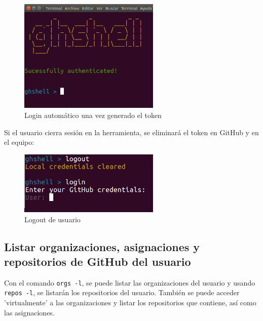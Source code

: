 		\begin{figure}[H]
		\begin{center}
		\includegraphics[width=0.6\textwidth]{images/ghshell2-4}
		\caption{Login automático una vez generado el token}
		\label{fig:ghshell2-4}
		\end{center}
		\end{figure}
		
	Si el usuario cierra sesión en la herramienta, se eliminará el token en GitHub y en el equipo:
	
		\begin{figure}[H]
		\begin{center}
		\includegraphics[width=0.6\textwidth]{images/ghshell2-2}
		\caption{Logout de usuario}
		\label{fig:ghshell2-2}
		\end{center}
		\end{figure}

\subsection{Listar organizaciones, asignaciones y repositorios de GitHub del usuario}
\label{subsec:3.1.2}   
    
    Con el comando \verb'orgs -l', se puede listar las organizaciones del usuario y usando \verb'repos -l', se listarán los repositorios del usuario. También se puede acceder 'virtualmente' a las organizaciones y listar los repositorios que contiene, así como las asignaciones.
\bigskip

